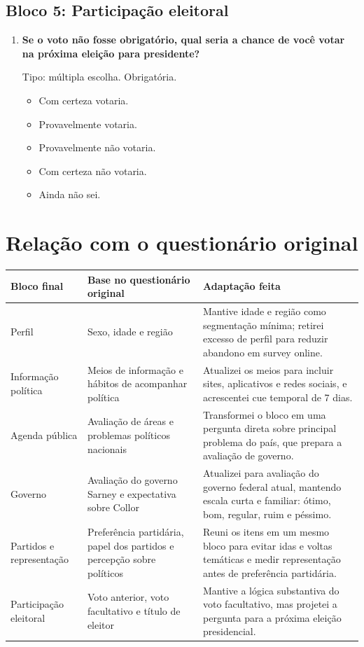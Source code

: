 \documentclass[11pt,a4paper]{article}
\begin{document}
\subsection*{Bloco 5: Participação eleitoral}

\begin{enumerate}[resume]
\item \textbf{Se o voto não fosse obrigatório, qual seria a chance de você votar na próxima eleição para presidente?}

Tipo: múltipla escolha. Obrigatória.
\begin{itemize}
\item Com certeza votaria.
\item Provavelmente votaria.
\item Provavelmente não votaria.
\item Com certeza não votaria.
\item Ainda não sei.
\end{itemize}
\end{enumerate}

\section*{Relação com o questionário original}

\begin{longtable}{p{}p{}p{}}
\toprule
\textbf{Bloco final} & \textbf{Base no questionário original} & \textbf{Adaptação feita} \\
\midrule
Perfil & Sexo, idade e região & Mantive idade e região como segmentação mínima; retirei excesso de perfil para reduzir abandono em survey online. \\
Informação política & Meios de informação e hábitos de acompanhar política & Atualizei os meios para incluir sites, aplicativos e redes sociais, e acrescentei cue temporal de 7 dias. \\
Agenda pública & Avaliação de áreas e problemas políticos nacionais & Transformei o bloco em uma pergunta direta sobre principal problema do país, que prepara a avaliação de governo. \\
Governo & Avaliação do governo Sarney e expectativa sobre Collor & Atualizei para avaliação do governo federal atual, mantendo escala curta e familiar: ótimo, bom, regular, ruim e péssimo. \\
Partidos e representação & Preferência partidária, papel dos partidos e percepção sobre políticos & Reuni os itens em um mesmo bloco para evitar idas e voltas temáticas e medir representação antes de preferência partidária. \\
Participação eleitoral & Voto anterior, voto facultativo e título de eleitor & Mantive a lógica substantiva do voto facultativo, mas projetei a pergunta para a próxima eleição presidencial. \\
\bottomrule
\end{longtable}
\end{document}

